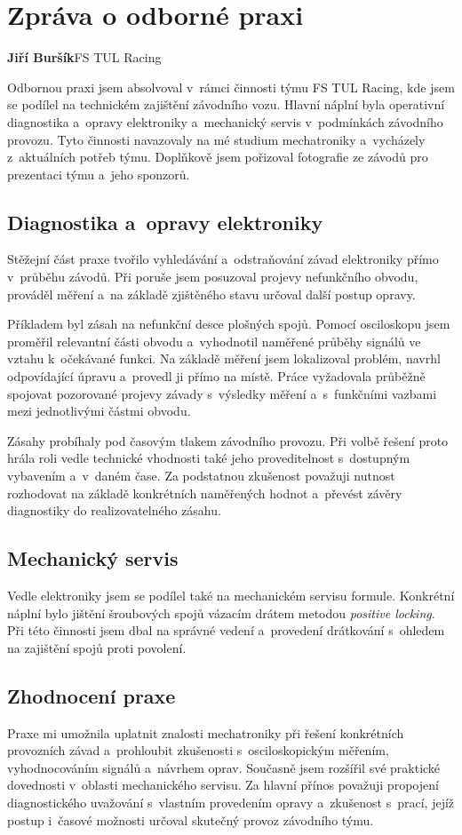 \documentclass[FM,SP,twoside]{tulthesis}
\begin{document}
\chapter*{Zpráva o odborné praxi}
\noindent\textbf{Jiří Buršík}\hfill FS TUL Racing
\par\vspace{1em}

Odbornou praxi jsem absolvoval v~rámci činnosti týmu FS TUL Racing,
kde jsem se podílel na technickém zajištění závodního vozu. Hlavní náplní
byla operativní diagnostika a~opravy elektroniky a~mechanický servis
v~podmínkách závodního provozu. Tyto činnosti navazovaly na mé studium
mechatroniky a~vycházely z~aktuálních potřeb týmu. Doplňkově jsem pořizoval
fotografie ze závodů pro prezentaci týmu a~jeho sponzorů.

\section*{Diagnostika a~opravy elektroniky}

Stěžejní část praxe tvořilo vyhledávání a~odstraňování závad elektroniky
přímo v~průběhu závodů. Při poruše jsem posuzoval projevy nefunkčního
obvodu, prováděl měření a~na základě zjištěného stavu určoval další
postup opravy.

Příkladem byl zásah na nefunkční desce plošných spojů. Pomocí
osciloskopu jsem proměřil relevantní části obvodu a~vyhodnotil naměřené
průběhy signálů ve vztahu k~očekávané funkci. Na základě měření jsem
lokalizoval problém, navrhl odpovídající úpravu a~provedl ji přímo
na místě. Práce vyžadovala průběžně spojovat pozorované projevy závady
s~výsledky měření a~s~funkčními vazbami mezi jednotlivými částmi obvodu.

Zásahy probíhaly pod časovým tlakem závodního provozu. Při volbě řešení
proto hrála roli vedle technické vhodnosti také jeho proveditelnost
s~dostupným vybavením a~v~daném čase. Za podstatnou zkušenost považuji
nutnost rozhodovat na základě konkrétních naměřených hodnot a~převést
závěry diagnostiky do realizovatelného zásahu.

\section*{Mechanický servis}

Vedle elektroniky jsem se podílel také na mechanickém servisu formule.
Konkrétní náplní bylo jištění šroubových spojů vázacím drátem metodou
\textit{positive locking}. Při této činnosti jsem dbal na správné vedení
a~provedení drátkování s~ohledem na zajištění spojů proti povolení.

\section*{Zhodnocení praxe}

Praxe mi umožnila uplatnit znalosti mechatroniky při řešení
konkrétních provozních závad a~prohloubit zkušenosti s~osciloskopickým
měřením, vyhodnocováním signálů a~návrhem oprav. Současně jsem rozšířil
své praktické dovednosti v~oblasti mechanického servisu. Za hlavní přínos
považuji propojení
diagnostického uvažování s~vlastním provedením opravy a~zkušenost
s~prací, jejíž postup i~časové možnosti určoval skutečný provoz
závodního týmu.
\end{document}
